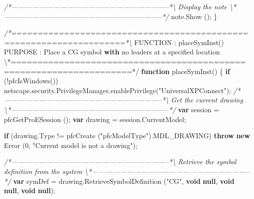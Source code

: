 \documentclass[]{article}
\newenvironment{Shaded}{}{}
\newcommand{\KeywordTok}[1]{\textcolor[rgb]{0.00,0.44,0.13}{\textbf{{#1}}}}
\newcommand{\DecValTok}[1]{\textcolor[rgb]{0.25,0.63,0.44}{{#1}}}
\newcommand{\StringTok}[1]{\textcolor[rgb]{0.25,0.44,0.63}{{#1}}}
\newcommand{\CommentTok}[1]{\textcolor[rgb]{0.38,0.63,0.69}{\textit{{#1}}}}
\newcommand{\OtherTok}[1]{\textcolor[rgb]{0.00,0.44,0.13}{{#1}}}
\newcommand{\FunctionTok}[1]{\textcolor[rgb]{0.02,0.16,0.49}{{#1}}}
\newcommand{\NormalTok}[1]{{#1}}
\begin{document}
\begin{Shaded}
\begin{Highlighting}[]
\CommentTok{/*--------------------------------------------------------------------*\textbackslash{}    }
\CommentTok{  Display the note}
\CommentTok{\textbackslash{}*--------------------------------------------------------------------*/}  
 \OtherTok{note}\NormalTok{.}\FunctionTok{Show} \NormalTok{(); }
\NormalTok{\}}

\CommentTok{/*====================================================================*\textbackslash{}}
 \NormalTok{FUNCTION : }\FunctionTok{placeSymInst}\NormalTok{() }
 \NormalTok{PURPOSE  :  Place a CG symbol }\KeywordTok{with} \NormalTok{no leaders at a specified location  }
\NormalTok{\textbackslash{}*====================================================================*}\OtherTok{/}
\KeywordTok{function} \FunctionTok{placeSymInst}\NormalTok{()}
\NormalTok{\{}
  \KeywordTok{if} \NormalTok{(!}\FunctionTok{pfcIsWindows}\NormalTok{())}
    \OtherTok{netscape}\NormalTok{.}\OtherTok{security}\NormalTok{.}\OtherTok{PrivilegeManager}\NormalTok{.}\FunctionTok{enablePrivilege}\NormalTok{(}\StringTok{"UniversalXPConnect"}\NormalTok{); }
 \CommentTok{/*--------------------------------------------------------------------*\textbackslash{} }
\CommentTok{   Get the current drawing}
\CommentTok{ \textbackslash{}*--------------------------------------------------------------------*/}
  \KeywordTok{var} \NormalTok{session = }\FunctionTok{pfcGetProESession} \NormalTok{();}
  \KeywordTok{var} \NormalTok{drawing = }\OtherTok{session}\NormalTok{.}\FunctionTok{CurrentModel}\NormalTok{;}
  
  \KeywordTok{if} \NormalTok{(}\OtherTok{drawing}\NormalTok{.}\FunctionTok{Type} \NormalTok{!= }\FunctionTok{pfcCreate} \NormalTok{(}\StringTok{"pfcModelType"}\NormalTok{).}\FunctionTok{MDL_DRAWING}\NormalTok{)}
    \KeywordTok{throw} \KeywordTok{new} \FunctionTok{Error} \NormalTok{(}\DecValTok{0}\NormalTok{, }\StringTok{"Current model is not a drawing"}\NormalTok{);}
  
\CommentTok{/*--------------------------------------------------------------------*\textbackslash{}  }
\CommentTok{  Retrieve the symbol definition from the system}
\CommentTok{\textbackslash{}*--------------------------------------------------------------------*/}    
  \KeywordTok{var} \NormalTok{symDef = }\OtherTok{drawing}\NormalTok{.}\FunctionTok{RetrieveSymbolDefinition} \NormalTok{(}\StringTok{"CG"}\NormalTok{, }
                         \KeywordTok{void} \KeywordTok{null}\NormalTok{, }\KeywordTok{void} \KeywordTok{null}\NormalTok{, }\KeywordTok{void} \KeywordTok{null}\NormalTok{);}
  

\end{Highlighting}
\end{Shaded}
\end{document}
